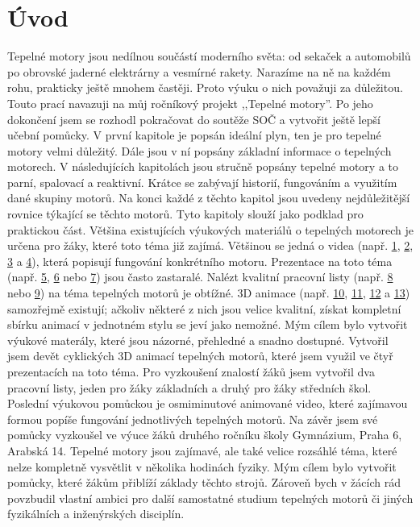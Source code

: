 \section{Úvod}
{Tepelné motory jsou nedílnou součástí moderního světa: od sekaček a automobilů po obrovské jaderné elektrárny a vesmírné rakety. Narazíme na ně na každém rohu, prakticky ještě mnohem častěji. Proto výuku o nich považuji za důležitou. Touto prací navazuji na můj ročníkový projekt ,,Tepelné motory”. Po jeho dokončení jsem se rozhodl pokračovat do soutěže SOČ a vytvořit ještě lepší učební pomůcky.}\odst
{V první kapitole je popsán ideální plyn, ten je pro tepelné motory velmi důležitý. Dále jsou v ní popsány základní informace o tepelných motorech. V následujících kapitolách jsou stručně popsány tepelné motory a to parní, spalovací a reaktivní. Krátce se zabývají historií, fungováním a využitím dané skupiny motorů. Na konci každé z těchto kapitol jsou uvedeny nejdůležitější rovnice týkající se těchto motorů. Tyto kapitoly slouží jako podklad pro praktickou část.}\odst
{Většina existujících výukových materiálů o tepelných motorech je určena pro žáky, které toto téma již zajímá. Většinou se jedná o videa (např. \href{https://www.youtube.com/watch?v=k9DhdvbmRiw}{1}, \href{https://www.youtube.com/watch?v=dR1pyp3q9Ko}{2}, \href{https://www.youtube.com/watch?v=eP8nWqcWmAc}{3} a \href{https://www.youtube.com/watch?v=Fpbg1jUh36M}{4}), která popisují fungování konkrétního motoru. Prezentace na toto téma (např. \href{https://zs-nucice.cz/UserFiles/File/eu_new_361-400/VY_32_INOVACE_374.pdf}{5}, \href{https://view.officeapps.live.com/op/view.aspx?src=http://dumy.cz/nahled/73077}{6} nebo \href{https://slideplayer.cz/slide/12677857/}{7}) jsou často zastaralé. Nalézt kvalitní pracovní listy (např. \href{https://view.officeapps.live.com/op/view.aspx?src=http://dumy.cz/nahled/117673}{8} nebo \href{https://www.soshlinky.cz/documents/uploads/71\%20Motory.xlsx}{9}) na téma tepelných motorů je obtížné. 3D animace (např. \href{https://www.youtube.com/watch?v=kWRRHRWuduk}{10}, \href{https://www.youtube.com/watch?v=ZQvfHyfgBtA&t=26s}{11}, \href{https://www.youtube.com/watch?v=MUxP3PCDRTE}{12} a \href{https://www.youtube.com/watch?v=Iiu3UyxLEHk}{13}) samozřejmě existují; ačkoliv některé z nich jsou velice kvalitní, získat kompletní sbírku animací v jednotném stylu se jeví jako nemožné.}\odst
{Mým cílem bylo vytvořit výukové materály, které jsou názorné, přehledné a snadno dostupné. Vytvořil jsem devět cyklických 3D animací tepelných motorů, které jsem využil ve čtyř prezentacích na toto téma. Pro vyzkoušení znalostí žáků jsem vytvořil dva pracovní listy, jeden pro žáky základních a druhý pro žáky středních škol. Poslední výukovou pomůckou je osmiminutové animované video, které zajímavou formou popíše fungování jednotlivých tepelných motorů. Na závěr jsem své pomůcky vyzkoušel ve výuce žáků druhého ročníku školy Gymnázium, Praha 6, Arabská 14.}\odst
{Tepelné motory jsou zajímavé, ale také velice rozsáhlé téma, které nelze kompletně vysvětlit v několika hodinách fyziky. Mým cílem bylo vytvořit pomůcky, které žákům přiblíží základy těchto strojů. Zároveň bych v žácích rád povzbudil vlastní ambici pro další samostatné studium tepelných motorů či jiných fyzikálních a inženýrských disciplín.}